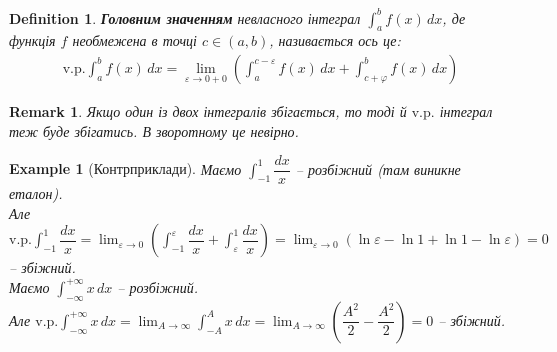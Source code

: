 \documentclass[a4paper, 10pt]{article}
\def\huge{\displaystyle}
\theoremstyle{theoremdd}
\theoremstyle{theoremdd}
\theoremstyle{theoremdd}
\newtheorem{definition}[theorem]{Definition}
\theoremstyle{theoremdd}
\theoremstyle{theoremdd}
\newtheorem{example}[theorem]{Example}
\theoremstyle{theoremdd}
\theoremstyle{theoremdd}
\newtheorem{remark}[theorem]{Remark}
\theoremstyle{theoremdd}
\theoremstyle{theoremdd}
\begin{document}
\begin{definition}
\textbf{Головним значенням} невласного інтеграл $\displaystyle\int_{a}^{b} f(x)\,dx$, де функція $f$ необмежена в точці $c \in (a,b)$, називається ось це:
\begin{align*}
\text{v.p.} \int_{a}^{b} f(x)\,dx = \lim_{\varepsilon \to 0+0} \left( \int_a^{c-\varepsilon} f(x)\,dx + \int_{c+\varphi}^b f(x)\,dx \right)
\end{align*}
\end{definition}

\begin{remark}
Якщо один із двох інтегралів збігається, то тоді й $\text{v.p}.$ інтеграл теж буде збігатись. В зворотному це невірно.
\end{remark}


\begin{example}[Контрприклади]
Маємо $\huge\int_{-1}^1 \dfrac{dx}{x}$ -- розбіжний (там виникне еталон).\\
Але $\text{v.p.} \huge\int_{-1}^1 \dfrac{dx}{x} = \huge\lim_{\varepsilon \to 0} \left( \int_{-1}^\varepsilon \dfrac{dx}{x} + \int_{\varepsilon}^1 \dfrac{dx}{x} \right) = \huge\lim_{\varepsilon \to 0} (\ln \varepsilon - \ln 1 + \ln 1 - \ln \varepsilon) = 0$ -- збіжний.
\bigskip \\
Маємо $\huge\int_{-\infty}^{+\infty} x\,dx$ -- розбіжний.\\
Але $\text{v.p.} \huge\int_{-\infty}^{+\infty} x\,dx = \lim_{A \to \infty} \int_{-A}^{A} x\,dx = \lim_{A \to \infty} \left( \dfrac{A^2}{2} - \dfrac{A^2}{2} \right)= 0$ -- збіжний.
\end{example}
\end{document}
